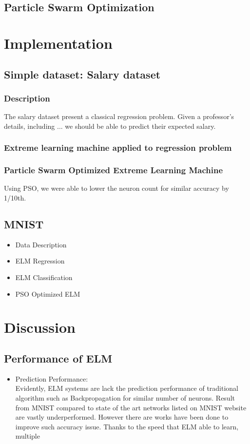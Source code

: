 \documentclass[11pt]{article}
\begin{document}
\subsection{Particle Swarm Optimization}
\newpage
\section{Implementation}
\subsection{Simple dataset: Salary dataset}
\subsubsection{Description}
The salary dataset present a classical regression problem. Given a professor's details, including ... we should be able to predict their expected salary.
\subsubsection{Extreme learning machine applied to regression problem}

\subsubsection{Particle Swarm Optimized Extreme Learning Machine}
Using PSO, we were able to lower the neuron count for similar accuracy by 1/10th.
\subsection{MNIST}
\begin{itemize}
    \item Data Description
    \item ELM Regression
    \item ELM Classification
    \item PSO Optimized ELM
\end{itemize}
\newpage
\section{Discussion}
\subsection{Performance of ELM}
\begin{itemize}
    \item Prediction Performance: \\
    Evidently, ELM systems are lack the prediction performance of traditional algorithm such as Backpropagation for similar number of neurons. Result from MNIST compared to state of the art networks listed on MNIST website are vastly underperformed. However there are works have been done to improve such accuracy issue. Thanks to the speed that ELM able to learn, multiple 
\end{itemize}
\newpage


\end{document}
